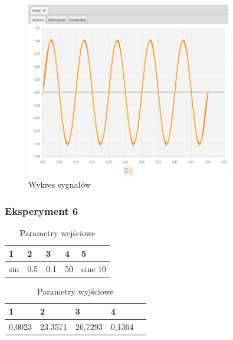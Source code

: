 \documentclass[12pt]{article}
\begin{document}
{{{                \begin{figure}[H]
                    \centering
                    \includegraphics[width=0.8\textwidth]{img/result/experiment4/05/data_draw_original_chart_recon_output_130631.png}
                    \caption{Wykres sygnałów}
                \end{figure}
            }
            \newpage

            \subsubsection{Eksperyment 6} {
                \begin{table}[H]
                    \centering
                    \begin{tabular}{|l|l|l|l|l|}
                        \hline
                        1 & 2 & 3 & 4 & 5   \\ \hline
                        sin & 0.5 & 0.1 & 50 & sinc 10  \\ \hline
                    \end{tabular}
                    \caption{Parametry wejściowe}
                \end{table}

                \begin{table}[H]
                    \centering
                    \begin{tabular}{|l|l|l|l|l|}
                        \hline
                        1 & 2 & 3 & 4   \\ \hline
                        0,0023 & 23,3571 & 26,7293 & 0,1364 \\ \hline
                    \end{tabular}
                    \caption{Parametry wyjściowe}
                \end{table}


}}}
\end{document}
